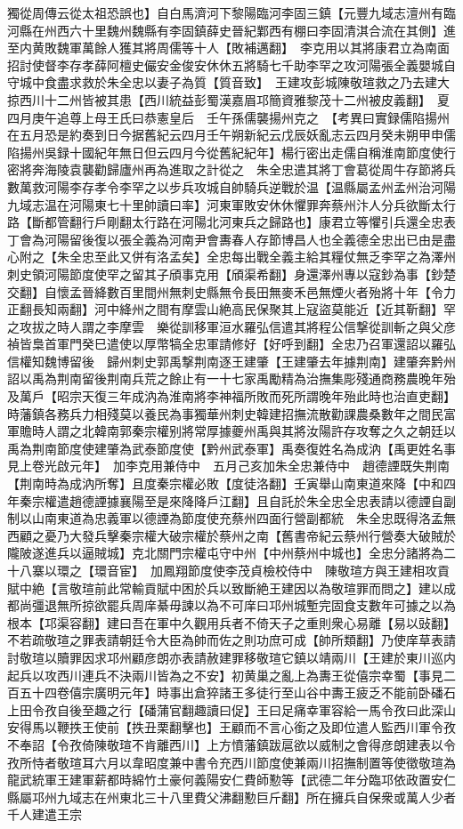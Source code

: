 獨從周傳云從太祖恐誤也】自白馬濟河下黎陽臨河李固三鎮【元豐九域志澶州有臨河縣在州西六十里魏州魏縣有李固鎮薛史晉紀鄴西有棚曰李固清淇合流在其側】進至内黄敗魏軍萬餘人獲其將周儒等十人【敗補邁翻】　李克用以其將康君立為南面招討使督李存孝薛阿檀史儼安金俊安休休五將騎七千助李罕之攻河陽張全義嬰城自守城中食盡求救於朱全忠以妻子為質【質音致】　王建攻彭城陳敬瑄救之乃去建大掠西川十二州皆被其患【西川統益彭蜀漢嘉眉邛簡資雅黎茂十二州被皮義翻】　夏四月庚午追尊上母王氏曰恭憲皇后　壬午孫儒襲揚州克之　【考異曰實録儒陷揚州在五月恐是約奏到日今据舊紀云四月壬午朔新紀云戊辰妖亂志云四月癸未朔甲申儒陷揚州吳録十國紀年無日但云四月今從舊紀紀年】楊行密出走儒自稱淮南節度使行密將奔海陵袁襲勸歸廬州再為進取之計從之　朱全忠遣其將丁會葛從周牛存節將兵數萬救河陽李存孝令李罕之以步兵攻城自帥騎兵逆戰於温【温縣屬孟州孟州治河陽九域志温在河陽東七十里帥讀曰率】河東軍敗安休休懼罪奔蔡州汴人分兵欲斷太行路【斷都管翻行戶剛翻太行路在河陽北河東兵之歸路也】康君立等懼引兵還全忠表丁會為河陽留後復以張全義為河南尹會夀春人存節博昌人也全義德全忠出已由是盡心附之【朱全忠至此又併有洛孟矣】全忠每出戰全義主給其糧仗無乏李罕之為澤州刺史領河陽節度使罕之留其子頎事克用【頎渠希翻】身還澤州專以寇鈔為事【鈔楚交翻】自懷孟晉絳數百里間州無刺史縣無令長田無麥禾邑無煙火者殆將十年【令力正翻長知兩翻】河中絳州之間有摩雲山絶高民保聚其上寇盜莫能近【近其靳翻】罕之攻拔之時人謂之李摩雲　樂從訓移軍洹水羅弘信遣其將程公信撃從訓斬之與父彦禎皆梟首軍門癸巳遣使以厚幣犒全忠軍請修好【好呼到翻】全忠乃召軍還詔以羅弘信權知魏博留後　歸州刺史郭禹撃荆南逐王建肇【王建肇去年據荆南】建肇奔黔州詔以禹為荆南留後荆南兵荒之餘止有一十七家禹勵精為治撫集彫殘通商務農晚年殆及萬戶【昭宗天復三年成汭為淮南將李神福所敗而死所謂晚年殆此時也治直吏翻】時藩鎮各務兵力相殘莫以養民為事獨華州刺史韓建招撫流散勸課農桑數年之間民富軍贍時人謂之北韓南郭秦宗權别將常厚據夔州禹與其將汝陽許存攻奪之久之朝廷以禹為荆南節度使建肇為武泰節度使【黔州武泰軍】禹奏復姓名為成汭【禹更姓名事見上卷光啟元年】　加李克用兼侍中　五月己亥加朱全忠兼侍中　趙德諲既失荆南【荆南時為成汭所奪】且度秦宗權必敗【度徒洛翻】壬寅舉山南東道來降【中和四年秦宗權遣趙德諲據襄陽至是來降降戶江翻】且自託於朱全忠全忠表請以德諲自副制以山南東道為忠義軍以德諲為節度使充蔡州四面行營副都統　朱全忠既得洛孟無西顧之憂乃大發兵擊秦宗權大破宗權於蔡州之南【舊書帝紀云蔡州行營奏大破賊於隴陂遂進兵以逼賊城】克北關門宗權屯守中州【中州蔡州中城也】全忠分諸將為二十八寨以環之【環音宦】　加鳳翔節度使李茂貞檢校侍中　陳敬瑄方與王建相攻貢賦中絶【言敬瑄前此常輸貢賦中困於兵以致斷絶王建因以為敬瑄罪而問之】建以成都尚彊退無所掠欲罷兵周庠綦毋諫以為不可庠曰邛州城塹完固食支數年可據之以為根本【邛渠容翻】建曰吾在軍中久觀用兵者不倚天子之重則衆心易離【易以䜴翻】不若疏敬瑄之罪表請朝廷令大臣為帥而佐之則功庶可成【帥所類翻】乃使庠草表請討敬瑄以贖罪因求邛州顧彦朗亦表請赦建罪移敬瑄它鎮以靖兩川【王建於東川巡内起兵以攻西川連兵不決兩川皆為之不安】初黄巢之亂上為夀王從僖宗幸蜀【事見二百五十四卷僖宗廣明元年】時事出倉猝諸王多徒行至山谷中夀王疲乏不能前卧磻石上田令孜自後至趣之行【磻蒲官翻趣讀曰促】王曰足痛幸軍容給一馬令孜曰此深山安得馬以鞭抶王使前【抶丑栗翻擊也】王顧而不言心銜之及即位遣人監西川軍令孜不奉詔【令孜倚陳敬瑄不肯離西川】上方憤藩鎮跋扈欲以威制之會得彦朗建表以令孜所恃者敬瑄耳六月以韋昭度兼中書令充西川節度使兼兩川招撫制置等使徵敬瑄為龍武統軍王建軍薪都時綿竹土豪何義陽安仁費師懃等【武德二年分臨邛依政置安仁縣屬邛州九域志在州東北三十八里費父沸翻懃巨斤翻】所在擁兵自保衆或萬人少者千人建遣王宗